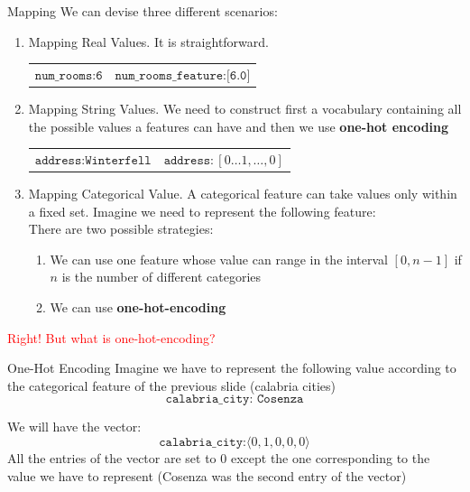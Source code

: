 \documentclass{beamer}
\begin{document}
\begin{frame}{Mapping}
\small
We can devise three different scenarios:
\begin{enumerate}
\pause
\item Mapping Real Values. It is straightforward.
\vskip 0.2cm
\begin{center}
\begin{tabular}{cc}
$\texttt{num\_rooms:6}$ & $\texttt{num\_rooms\_feature:[6.0]}$
\end{tabular}
\end{center}
\pause
\item Mapping String Values. We need to construct first a vocabulary containing 
all the possible values a features can have and then we use \textbf{one-hot encoding}
\vskip 0.2cm
\begin{center}
\setlength{\tabcolsep}{8pt}
\begin{tabular}{ll}
$\texttt{address:Winterfell}$ & $\texttt{address}:[0\dots 1,\dots,0]$
\end{tabular}
\end{center}
\pause
\item Mapping Categorical Value. A categorical feature can take values only within a fixed set.
Imagine we need to represent the following feature:
     \\
There are two possible strategies:
\begin{enumerate}
\item We can use one feature whose value can range in the interval $[0,n-1]$ if $n$ is the number of
different categories
\item We can use \textbf{one-hot-encoding}
\end{enumerate}
\end{enumerate}
\pause
\textcolor{red}{Right! But what is one-hot-encoding?}
\end{frame}

\begin{frame}{One-Hot Encoding}
Imagine we have to represent the following value according to the categorical feature
of the previous slide (calabria cities)
\[
	\texttt{calabria\_city: Cosenza}
\]

We will have the vector:
\[
	\texttt{calabria\_city:} \langle 0,1,0,0,0 \rangle
\]
All the entries of the vector are set to $0$ except the one corresponding to the
value we have to represent (Cosenza was the second entry of the vector)
\end{frame}
\end{document}
